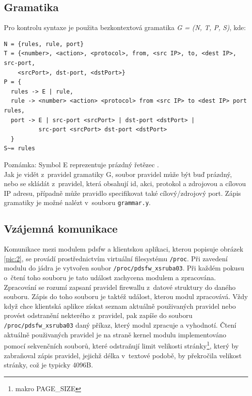 \documentclass[10pt,a4paper,notitlepage]{article}
\begin{document}
\newpage
\subsection{Gramatika}
Pro kontrolu syntaxe je použita bezkontextová gramatika \textit{G = (N, T, P,
S)}, kde:


\begin{lstlisting}
N = {rules, rule, port}
T = {<number>, <action>, <protocol>, from, <src IP>, to, <dest IP>, src-port, 
    <srcPort>, dst-port, <dstPort>}
P = {
  rules -> E | rule,
  rule -> <number> <action> <protocol> from <src IP> to <dest IP> port rules,
  port -> E | src-port <srcPort> | dst-port <dstPort> | 
          src-port <srcPort> dst-port <dstPort>
  }
S~= rules
\end{lstlisting}

Poznámka: Symbol E reprezentuje prázdný řetězec \epsilon.
\\

Jak je vidět z~pravidel gramatiky G, soubor pravidel může být buď prázdný, nebo
se skládát z~pravidel, která obsahují id, akci, protokol a zdrojovou a cílovou
IP adresu, případně může pravidlo specifikovat také cílový/zdrojový port. Zápis
gramatiky je možné nalézt v~souboru \texttt{grammar.y}.

\subsection{Vzájemná komunikace}
Komunikace mezi modulem pdsfw a klientskou aplikaci, kterou popisuje obrázek
\ref{pic:2}, se provádí prostřednictvím virtuální filesystému \texttt{/proc}.
Při zavedení modulu do jádra je vytvořen soubor \texttt{/proc/pdsfw\_xsruba03}.
Při každém pokusu o~čtení toho souboru je tato událost zachycena modulem a
zpracována. Zpracování se rozumí zapsaní pravidel firewallu z~datové struktury
do daného souboru. Zápis do toho souboru je taktéž událost, kterou modul
zpracovává. Vždy když chce klientská aplikce získat seznam aktuálně použivaných
pravidel nebo provést odstranění nekterého z~pravidel, pak zapíše do souboru
\texttt{/proc/pdsfw\_xsruba03} daný příkaz, který modul zpracuje a vyhodnotí.
Čtení aktuálně použivaných pravidel je na straně kernel modulu implementováno
pomocí sekvenčních souborů, které odstraňují limit velikosti
stránky\footnote{makro PAGE\_SIZE}, který by zabraňoval zápis pravidel, jejichž
délka v~textové podobě, by překročila velikost stránky, což je typicky 4096B.
\end{document}

